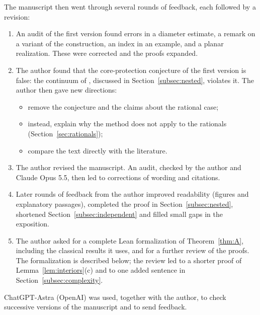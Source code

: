 \documentclass[11pt]{amsart}
\theoremstyle{definition}
\theoremstyle{remark}
\begin{document}
The manuscript then went through several rounds of feedback, each followed by a revision:
\begin{enumerate}
\item An audit of the first version found errors in a diameter estimate, a remark on a variant of the construction, an index in an example, and a planar realization. These were corrected and the proofs expanded.
\item The author found that the core-protection conjecture of the first version is false: the continuum of \cite[Ejemplo~3.2.1]{Ra}, discussed in Section~\ref{subsec:nested}, violates it. The author then gave new directions:
\begin{itemize}
\item remove the conjecture and the claims about the rational case;
\item instead, explain why the method does not apply to the rationals (Section~\ref{sec:rationals});
\item compare the text directly with the literature.
\end{itemize}
\item The author revised the manuscript. An audit, checked by the author and Claude Opus 5.5, then led to corrections of wording and citations.
\item Later rounds of feedback from the author improved readability (figures and explanatory passages), completed the proof in Section~\ref{subsec:nested}, shortened Section~\ref{subsec:independent} and filled small gaps in the exposition.
\item The author asked for a complete Lean formalization of Theorem~\ref{thm:A}, including the classical results it uses, and for a further review of the proofs. The formalization is described below; the review led to a shorter proof of Lemma~\ref{lem:interiors}(c) and to one added sentence in Section~\ref{subsec:complexity}.
\end{enumerate}

ChatGPT-Astra (OpenAI) was used, together with the author, to check successive versions of the manuscript and to send feedback.
\end{document}
